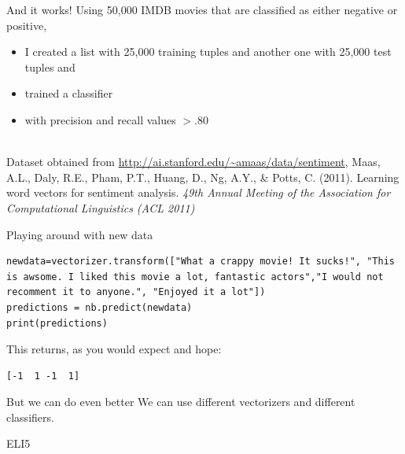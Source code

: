 \documentclass[handout]{beamer}
\begin{document}
\begin{frame}{And it works!}
Using 50,000 IMDB movies that are classified as either negative or positive,
\begin{itemize}
	\item I created a list with 25,000 training tuples and another one with 25,000 test tuples and
	\item trained a classifier
	\item with precision and recall values $>.80$
\end{itemize}
~\\
\tiny{Dataset obtained from \url{http://ai.stanford.edu/~amaas/data/sentiment}, Maas, A.L., Daly, R.E., Pham, P.T., Huang, D., Ng, A.Y., \& Potts, C. (2011). Learning word vectors for sentiment analysis. \emph{49th Annual Meeting of the Association for Computational Linguistics (ACL 2011)}
}

\end{frame}

\begin{frame}[fragile]{Playing around with new data}
\begin{lstlisting}
newdata=vectorizer.transform(["What a crappy movie! It sucks!", "This is awsome. I liked this movie a lot, fantastic actors","I would not recomment it to anyone.", "Enjoyed it a lot"])
predictions = nb.predict(newdata)
print(predictions)
\end{lstlisting}
This returns, as you would expect and hope:
\begin{lstlisting} 
[-1  1 -1  1]
\end{lstlisting}


\end{frame}




\begin{frame}{But we can do even better}
We can use different vectorizers and different classifiers.
\end{frame}

\begin{frame}{ELI5}
\end{frame}
\end{document}
